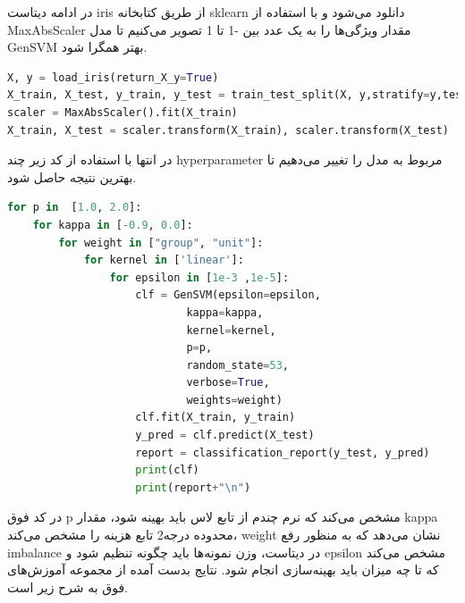 \documentclass{article}
\begin{document}
در ادامه دیتاست iris از طریق کتابخانه sklearn دانلود می‌شود و با استفاده از MaxAbsScaler مقدار ویژگی‌ها را به یک عدد بین -1 تا 1 تصویر می‌کنیم تا مدل GenSVM بهتر همگرا شود.
\begin{LTR}
	\begin{lstlisting}[language=Python, caption=Intsall Libraries]
X, y = load_iris(return_X_y=True)
X_train, X_test, y_train, y_test = train_test_split(X, y,stratify=y,test_size=0.2,random_state=53)
scaler = MaxAbsScaler().fit(X_train)
X_train, X_test = scaler.transform(X_train), scaler.transform(X_test)
	\end{lstlisting}
\end{LTR}

در انتها با استفاده از کد زیر چند hyperparameter مربوط به مدل را تغییر می‌دهیم تا بهترین نتیجه حاصل شود.

\begin{LTR}
	\begin{lstlisting}[language=Python, caption=Intsall Libraries]
for p in  [1.0, 2.0]:
    for kappa in [-0.9, 0.0]:
        for weight in ["group", "unit"]:
            for kernel in ['linear']:
                for epsilon in [1e-3 ,1e-5]:
                    clf = GenSVM(epsilon=epsilon,
                            kappa=kappa,
                            kernel=kernel,
                            p=p,
                            random_state=53,
                            verbose=True,
                            weights=weight)
                    clf.fit(X_train, y_train)
                    y_pred = clf.predict(X_test)
                    report = classification_report(y_test, y_pred)
                    print(clf)
                    print(report+"\n")

	\end{lstlisting}
\end{LTR}
در کد فوق p مشخص می‌کند که نرم چندم از تابع لاس باید بهینه شود، مقدار kappa محدوده درجه2 تابع هزینه را مشخص می‌کند، weight نشان می‌دهد که به منظور رفع imbalance در دیتاست، وزن نمونه‌ها باید چگونه تنظیم شود و epsilon مشخص می‌کند که تا چه میزان باید بهینه‌سازی انجام شود.
نتایج بدست آمده از مجموعه آموزش‌های فوق به شرح زیر است.
\end{document}
